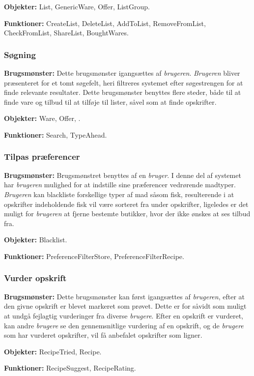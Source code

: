 \textbf{Objekter:} List, GenericWare, Offer, ListGroup.

\textbf{Funktioner:} CreateList, DeleteList, AddToList, RemoveFromList, CheckFromList, ShareList, BoughtWares.

\subsubsection*{Søgning}
\textbf{Brugsmønster:} Dette brugsmønster igangsættes af \textit{brugeren}.
\textit{Brugeren} bliver præsenteret for et tomt søgefelt, heri filtreres systemet efter søgestrengen for at finde relevante resultater.
Dette brugsmønster benyttes flere steder, både til at finde vare og tilbud til at tilføje til lister, såvel som at finde opskrifter.


\textbf{Objekter:} Ware, Offer, .

\textbf{Funktioner:} Search, TypeAhead.

\subsubsection*{Tilpas præferencer}
\textbf{Brugsmønster:} Brugsmønstret benyttes af en \textit{bruger}.
I denne del af systemet har \textit{brugeren} mulighed for at indstille sine præferencer vedrørende madtyper.
\textit{Brugeren} kan blackliste forskellige typer af mad såsom fisk, resulterende i at opskrifter indeholdende fisk vil være sorteret fra under opskrifter, ligeledes er det muligt for \textit{brugeren} at fjerne bestemte butikker, hvor der ikke ønskes at ses tilbud fra.

\textbf{Objekter:} Blacklist.

\textbf{Funktioner:} PreferenceFilterStore, PreferenceFilterRecipe.

\subsubsection*{Vurder opskrift}
\textbf{Brugsmønster:} Dette brugsmønster kan først igangsættes af \textit{brugeren}, efter at den givne opskrift er blevet markeret som prøvet.
Dette er for såvidt som muligt at undgå fejlagtig vurderinger fra diverse \textit{brugere}.
Efter en opskrift er vurderet, kan andre \textit{brugere} se den gennemsnitlige vurdering af en opskrift, og de \textit{brugere} som har vurderet opskrifter, vil få anbefalet opskrifter som ligner.

\textbf{Objekter:} RecipeTried, Recipe.

\textbf{Funktioner:} RecipeSuggest, RecipeRating.

